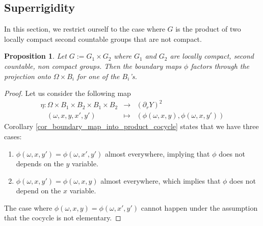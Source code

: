 \documentclass{amsart}
\numberwithin{equation}{section}
\newtheorem{prop}[thm]{Proposition}
\theoremstyle{definition}
\begin{document}
\subsection{Superrigidity}
In this section, we restrict ourself to the case where $G$ is the product of two locally compact second countable groups that are not compact.
\begin{prop}\label{prop_boundary_map_factors}
    Let $G:=G_1\times G_2$ where $G_1$ and $G_2$ are locally compact, second countable, non compact groups. Then the boundary maps $\phi$ factors through the projection onto $\Omega\times B_i$ for one of the $B_i$'s.
\end{prop}
\begin{proof}
    Let us consider the following map 
    \begin{eqnarray*}
    \eta:\Omega\times B_1\times B_2 \times B_1 \times B_2 &\rightarrow & (\partial_r Y)^2\\
\ \ \ \ (\omega,x,y,x',y') &\mapsto & (\phi(\omega,x,y),\phi(\omega,x,y'))
    \end{eqnarray*}
    Corollary \ref{cor_boundary_map_into_product_cocycle} states that we have three cases:
    \begin{enumerate}
        \item $\phi(\omega,x,y')=\phi(\omega,x',y')$ almost everywhere, implying that $\phi$ does not depends on the $y$ variable.
        \item $\phi(\omega,x,y')=\phi(\omega,x,y)$ almost everywhere, which implies that $\phi$ does not depend on the $x$ variable.
    \end{enumerate}
    The case where $\phi(\omega,x,y)=\phi(\omega,x',y')$ cannot happen under the assumption that the cocycle is not elementary.
\end{proof}
\end{document}
